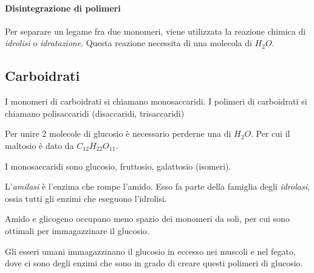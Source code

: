 \documentclass[a4paper]{article}
\begin{document}
\paragraph{Disintegrazione di polimeri}

Per separare un legame fra due monomeri, viene utilizzata la reazione chimica di \textit{idrolisi} o \textit{idratazione}.
Questa reazione necessita di una molecola di \(H_2O\).

\pagebreak

\subsection{Carboidrati}


I monomeri di carboidrati si chiamano monosaccaridi.
I polimeri di carboidrati si chiamano polisaccaridi (disaccaridi, trisaccaridi)


Per unire 2 molecole di glucosio
è necessario perderne una di \(H_2O\). Per cui il maltosio è dato da \(C_{12}H_{22}O_{11}\).


I monosaccaridi sono glucosio, fruttosio, galattosio (isomeri).


L'\textit{amilasi} è l'enzima che rompe l'amido.
Esso fa parte della famiglia degli \textit{idrolasi}, ossia tutti gli enzimi che
eseguono l'idrolisi.


Amido e glicogeno occupano meno spazio dei monomeri da soli, per cui sono ottimali per immagazzinare
il glucosio.

Gli esseri umani immagazzinano il glucosio in eccesso nei muscoli e nel fegato, dove ci sono degli enzimi
che sono in grado di creare questi polimeri di glucosio.
\end{document}
